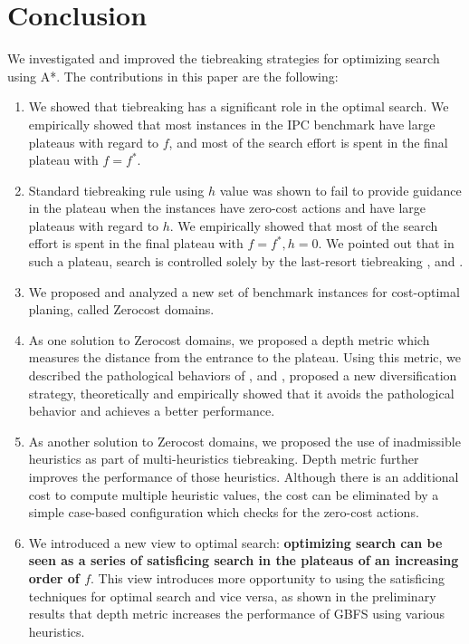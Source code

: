 
\section{Conclusion}

We investigated and improved the tiebreaking strategies for optimizing search using A*.
The contributions in this paper are the following:

\begin{enumerate}
 \item We showed that tiebreaking has a significant role in the optimal
       search. We empirically showed that most instances in the IPC
       benchmark have large plateaus with regard to $f$, and most of the
       search effort is spent in the final plateau with $f=f^*$.
 \item Standard tiebreaking rule using $h$ value was shown to fail to
       provide guidance in the plateau when the instances have zero-cost
       actions and have large plateaus with regard to $h$.
       We empirically showed that most of the search effort is spent in
       the final plateau with $f=f^*, h=0$. We pointed out that in such
       a plateau, search is controlled solely by the
       last-resort tiebreaking \fifo, \lifo and \ro.
 \item We proposed and analyzed a new set of benchmark
       instances for cost-optimal planing, called Zerocost domains.
 \item As one solution to Zerocost domains, we proposed a depth metric
       which measures the distance from the entrance to the
       plateau. Using this metric, we described the pathological
       behaviors of \fifo, \lifo and \ro, proposed a new diversification
       strategy, theoretically and empirically showed that it avoids the
       pathological behavior and achieves a better performance.
 \item As another solution to Zerocost domains, we proposed the use of
       inadmissible heuristics as part of multi-heuristics tiebreaking.
       Depth metric further improves the performance of those
       heuristics. Although there is an additional cost to compute
       multiple heuristic values, the cost can be eliminated by a simple
       case-based configuration which checks for the zero-cost actions.
 \item We introduced a new view to optimal \astar search:
       \textbf{optimizing search can be seen as a series of
       satisficing search in the plateaus of an increasing order of
       $f$}. This view introduces more opportunity to using the
       satisficing techniques for optimal search and vice versa, as
       shown in the preliminary results that depth metric increases the
       performance of GBFS using various heuristics.
\end{enumerate}

